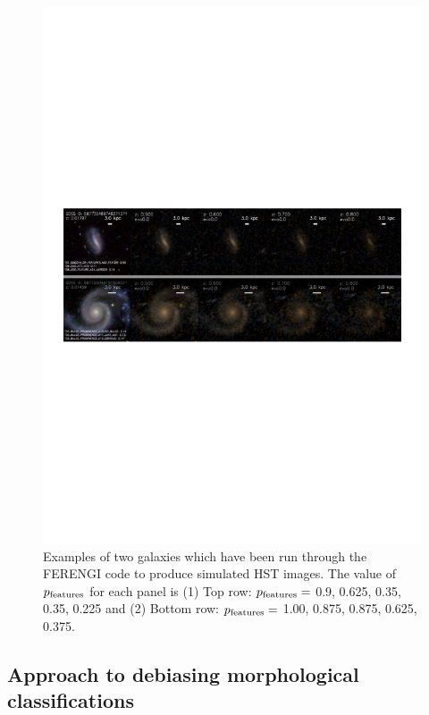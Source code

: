 \documentclass[usenatbib]{mn2e}
\begin{document}
\begin{figure}
\includegraphics[width=160mm]{figures/example_ferengi.pdf}
\caption{Examples of two galaxies which have been run through the FERENGI code to produce simulated HST images. The value of $p_{\rm features}$ for each panel is (1) Top row: $p_{\rm features}=$ 0.9, 0.625, 0.35, 0.35, 0.225 and (2) Bottom row: $p_{\rm features}=$ 1.00, 0.875, 0.875, 0.625, 0.375. \label{exampleFERENGI}}
\end{figure}

\subsection{Approach to debiasing morphological classifications}
\label{sec:zeta}
\end{document}
